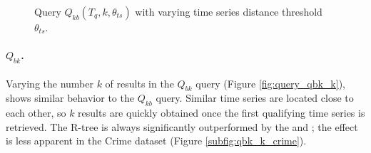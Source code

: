 \begin{figure}[!ht]
	\caption{Query $Q_{kb}(T_q, k, \theta_{ts})$ with varying time series distance threshold $\theta_{ts}$.}
	\label{fig:query_qkb_theta_ts}
\end{figure}


\paragraph{$Q_{bk}$.} Varying the number $k$ of results in the $Q_{bk}$ query (Figure \ref{fig:query_qbk_k}), shows similar behavior to the $Q_{kb}$ query. Similar time series are located close to each other, so $k$ results are quickly obtained once the first qualifying time series is retrieved. The R-tree is always significantly outperformed by the \tsr and \btsr;  the effect is less apparent in the Crime dataset (Figure \ref{subfig:qbk_k_crime}).

